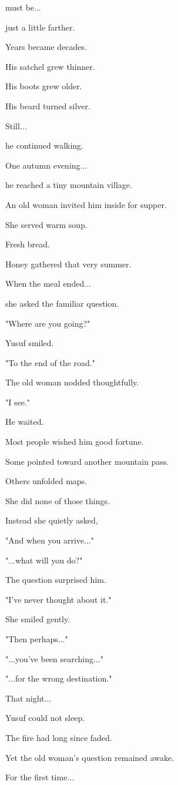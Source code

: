 \documentclass[12pt,openany]{book}
\begin{document}
must be...

just a little farther.

Years became decades.

His satchel grew thinner.

His boots grew older.

His beard turned silver.

Still...

he continued walking.

One autumn evening...

he reached a tiny mountain village.

An old woman invited him inside for supper.

She served warm soup.

Fresh bread.

Honey gathered that very summer.

When the meal ended...

she asked the familiar question.

"Where are you going?"

Yusuf smiled.

"To the end of the road."

The old woman nodded thoughtfully.

"I see."

He waited.

Most people wished him good fortune.

Some pointed toward another mountain pass.

Others unfolded maps.

She did none of those things.

Instead she quietly asked,

"And when you arrive..."

"...what will you do?"

The question surprised him.

"I've never thought about it."

She smiled gently.

"Then perhaps..."

"...you've been searching..."

"...for the wrong destination."

That night...

Yusuf could not sleep.

The fire had long since faded.

Yet the old woman's question remained awake.

For the first time...
\end{document}
